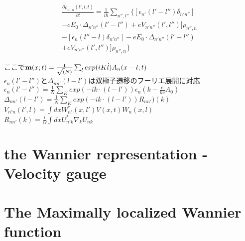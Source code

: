 \documentclass[aps,prb,preprint]{revtex4-1}
\begin{document}
\begin{appendix}
\begin{eqnarray*}
\frac{ \partial \rho_{n',n}(l', l; t) }{\partial t } = \frac{1}{i \hbar} \sum_{n'',l''} \{ [ \epsilon_{n'}(l'-l'') \delta_{n'n''} ] \\
- eE_0 \cdot \Delta_{n'n''}(l'-l'') + eV_{n'n''}(l', l'')] \rho_{n'',n}\\
- [ \epsilon_{n}(l''-l) \delta_{n'n''} ] - eE_0 \cdot \Delta_{n'n''}(l'-l'') \\
+ eV_{n'n''}(l', l'')] \rho_{n'',n} \}
\end{eqnarray*}

ここで${\bf m}(x;t) = \frac{1}{\sqrt (N)} \sum_{l} exp(iK \dot l) A_n(x-l; t)$\\
$\epsilon_{n}(l'-l'')$と$\Delta_{nn'}(l-l')$は双極子遷移のフーリエ展開に対応\\
$\epsilon_{n}(l'-l'') =\frac{1}{N} \sum_K exp(-ik \cdot (l-l') ) \epsilon_n(k-\frac{e}{\hbar c}A_0)$\\
$\Delta_{nn'}(l-l')=\frac{1}{N}\sum_K exp(-ik \cdot (l-l') ) R_{nn'})(k) $\\
$V_{n'n}(l',l)= \int dx W^*_{n'}(x,l') V(x,t) W_n (x,l) $\\
$R_{nn'}(k) = \frac{i}{\Omega} \int dx U^*_{n'k} \nabla_k U_{nk}$\\

\section{the Wannier representation -Velocity gauge }\cite{Iafrate} 
\label{sec:WV}



\section{The Maximally localized Wannier function}
\end{appendix}




\end{document}
